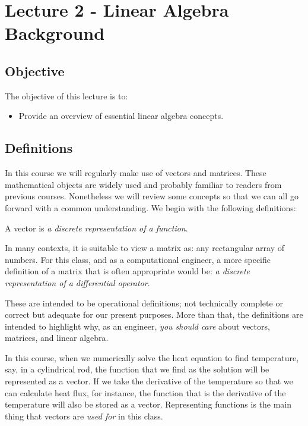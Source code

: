 \chapter{Lecture 2 - Linear Algebra Background}
\label{ch:lec2n}
\section{Objective}
The objective of this lecture is to:
\begin{itemize}
\item Provide an overview of essential linear algebra concepts.
\end{itemize}
\setcounter{lstannotation}{0}

\section{Definitions}
In this course we will regularly make use of vectors and matrices.  These mathematical objects are widely used and probably familiar to readers from previous courses.  Nonetheless we will review some concepts so that we can all go forward with a common understanding.  We begin with the following definitions:

\begin{definition}[Vector]
A vector is \emph{a discrete representation of a function}.
\end{definition}

\begin{definition}[Matrix]
In many contexts, it is suitable to view a matrix as: any rectangular array of numbers.  For this class, and as a computational engineer, a more specific definition of a matrix that is often appropriate would be: \emph{a discrete representation of a differential operator}. 
\end{definition}

These are intended to be operational definitions; not technically complete or correct but adequate for our present purposes.  More than that, the definitions are intended to highlight why, as an engineer, \emph{you should care} about vectors, matrices, and linear algebra.  

In this course, when we numerically solve the heat equation to find temperature, say, in a cylindrical rod, the function that we find as the solution will be represented as a vector. If we take the derivative of the temperature so that we can calculate heat flux, for instance, the function that is the derivative of the temperature will also be stored as a vector.  Representing functions is the main thing that vectors are \emph{used for} in this class.

